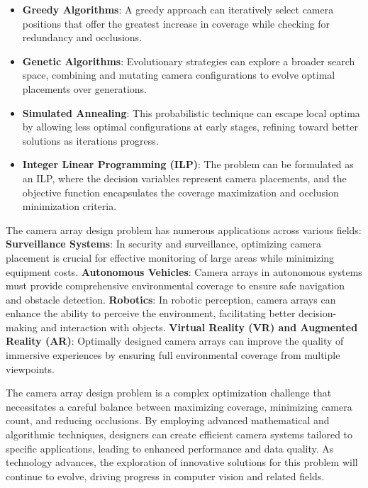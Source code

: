 \begin{itemize}
	\item \textbf{Greedy Algorithms}: A greedy approach can iteratively select camera positions that offer the greatest increase in coverage while checking for redundancy and occlusions.
	
	\item \textbf{Genetic Algorithms}: Evolutionary strategies can explore a broader search space, combining and mutating camera configurations to evolve optimal placements over generations.
	
	\item \textbf{Simulated Annealing}: This probabilistic technique can escape local optima by allowing less optimal configurations at early stages, refining toward better solutions as iterations progress.
	
	\item \textbf{Integer Linear Programming (ILP)}: The problem can be formulated as an ILP, where the decision variables represent camera placements, and the objective function encapsulates the coverage maximization and occlusion minimization criteria.
\end{itemize}

The camera array design problem has numerous applications across various fields:
\textbf{Surveillance Systems}: In security and surveillance, optimizing camera placement is crucial for effective monitoring of large areas while minimizing equipment costs.
\textbf{Autonomous Vehicles}: Camera arrays in autonomous systems must provide comprehensive environmental coverage to ensure safe navigation and obstacle detection.
\textbf{Robotics}: In robotic perception, camera arrays can enhance the ability to perceive the environment, facilitating better decision-making and interaction with objects.
\textbf{Virtual Reality (VR) and Augmented Reality (AR)}: Optimally designed camera arrays can improve the quality of immersive experiences by ensuring full environmental coverage from multiple viewpoints.

The camera array design problem is a complex optimization challenge that necessitates a careful balance between maximizing coverage, minimizing camera count, and reducing occlusions. By employing advanced mathematical and algorithmic techniques, designers can create efficient camera systems tailored to specific applications, leading to enhanced performance and data quality. As technology advances, the exploration of innovative solutions for this problem will continue to evolve, driving progress in computer vision and related fields.


